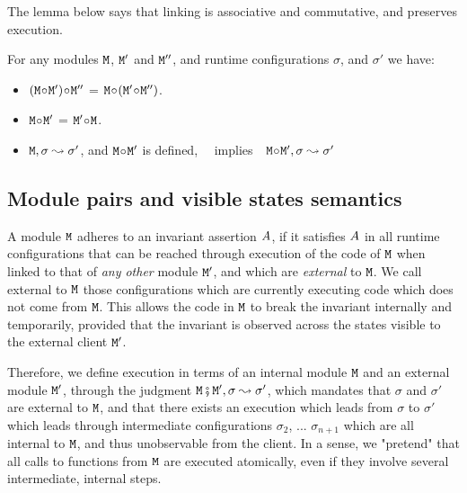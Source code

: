 The lemma below says  that linking is associative and commutative, and preserves execution.

\begin{lemma}
 For any modules $\M$,   $\M'$ and $\M''$, and runtime configurations $\sigma$, and $\sigma'$ we have$:$
 \label{lemma:linking:properties}

 \begin{itemize}
     \item
     $(\M \link \M')\link \M''$ = $\M \link (\M' \link \M'')$.
    \item
      $\M \link \M'$  = $\M' \link\M$.
      \item
      $\M, \sigma \leadsto \sigma'$, and $\M\link \M'$ is defined, \  \  implies\ \   $\M\link \M', \sigma \leadsto \sigma'$
   \end{itemize}

 \end{lemma}

 \subsection{Module pairs and visible states semantics}

A module $\M$ adheres to an invariant assertion  $\A$, if it satisfies
$\A$ in all runtime configurations that  can be reached through execution of the code of $\M$ when linked to that
of {\em any other} module $\M'$, and
which are {\em external} to $\M$. We call external to $\M$ those
configurations which are currently executing code which does not come from $\M$. This allows the code in $\M$ to break
the invariant internally and temporarily, provided that the invariant is observed across the states visible to the external client $\M'$.

Therefore, we define execution in terms of an internal module $\M$ and an external module $\M'$, through the judgment $\M \mkpair \M', \sigma \leadsto \sigma'$, which mandates that $\sigma$ and $\sigma'$ are external to $\M$, and that there exists an execution which leads from $\sigma$ to $\sigma'$ which leads through intermediate configurations
$\sigma_2$, ...  $\sigma_{n+1}$ which are all internal to $\M$, and thus unobservable from the client.
In a sense, we "pretend" that all calls to functions from $\M$ are executed atomically, even if they involve several intermediate,
internal steps.


